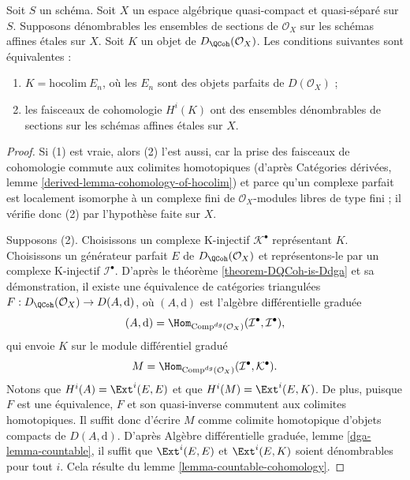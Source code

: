 \begin{lemma}
\label{lemma-countable}
Soit $S$ un sch\'ema.
Soit $X$ un espace alg\'ebrique quasi-compact et quasi-s\'epar\'e sur $S$.
Supposons d\'enombrables les ensembles de sections de $\mathcal{O}_X$ sur les
sch\'emas affines \'etales sur $X$. Soit $K$ un objet de
$D_\QCoh(\mathcal{O}_X)$. Les conditions suivantes sont \'equivalentes :
\begin{enumerate}
\item $K=\text{hocolim}\ E_n$, o\`u les $E_n$ sont des objets parfaits de
$D(\mathcal{O}_X)$ ;
\item les faisceaux de cohomologie $H^i(K)$ ont des ensembles d\'enombrables
de sections sur les sch\'emas affines \'etales sur $X$.
\end{enumerate}
\end{lemma}

\begin{proof}
Si (1) est vraie, alors (2) l'est aussi, car la prise des faisceaux de
cohomologie commute aux colimites homotopiques (d'apr\`es Cat\'egories
d\'eriv\'ees, lemme \ref{derived-lemma-cohomology-of-hocolim}) et parce qu'un
complexe parfait est localement isomorphe \`a un complexe fini de
$\mathcal{O}_X$-modules libres de type fini ; il v\'erifie donc (2) par
l'hypoth\`ese faite sur $X$.

\medskip\noindent
Supposons (2).
Choisissons un complexe K-injectif $\mathcal{K}^\bullet$ repr\'esentant $K$.
Choisissons un g\'en\'erateur parfait $E$ de
$D_\QCoh(\mathcal{O}_X)$ et repr\'esentons-le par un complexe K-injectif
$\mathcal{I}^\bullet$. D'apr\`es le th\'eor\`eme
\ref{theorem-DQCoh-is-Ddga} et sa d\'emonstration, il existe une \'equivalence
de cat\'egories triangul\'ees
$F:D_\QCoh(\mathcal{O}_X)\to D(A,\text{d})$, o\`u $(A,\text{d})$ est
l'alg\`ebre diff\'erentielle gradu\'ee
$$
(A, \text{d}) =
\Hom_{\text{Comp}^{dg}(\mathcal{O}_X)}
(\mathcal{I}^\bullet, \mathcal{I}^\bullet),
$$
qui envoie $K$ sur le module diff\'erentiel gradu\'e
$$
M = \Hom_{\text{Comp}^{dg}(\mathcal{O}_X)}
(\mathcal{I}^\bullet, \mathcal{K}^\bullet).
$$
Notons que $H^i(A)=\Ext^i(E,E)$ et que
$H^i(M)=\Ext^i(E,K)$. De plus, puisque $F$ est une \'equivalence, $F$ et son
quasi-inverse commutent aux colimites homotopiques. Il suffit donc d'\'ecrire
$M$ comme colimite homotopique d'objets compacts de $D(A,\text{d})$.
D'apr\`es Alg\`ebre diff\'erentielle gradu\'ee, lemme
\ref{dga-lemma-countable}, il suffit que $\Ext^i(E,E)$ et $\Ext^i(E,K)$ soient
d\'enombrables pour tout $i$. Cela r\'esulte du lemme
\ref{lemma-countable-cohomology}.
\end{proof}

